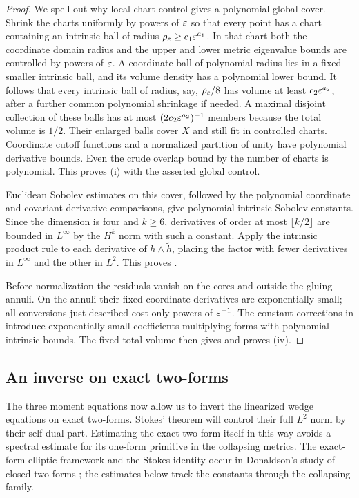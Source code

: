 \begin{proof}
We spell out why local chart control gives a polynomial global
cover.  Shrink the charts uniformly by powers of $\varepsilon$ so that
every point has a chart containing an intrinsic ball of radius
$\rho_\varepsilon\ge c_1\varepsilon^{a_1}$.  In that chart both the coordinate
domain radius and the upper and lower metric eigenvalue bounds are
controlled by powers of $\varepsilon$.  A coordinate ball of polynomial
radius lies in a fixed smaller intrinsic ball, and its volume density
has a polynomial lower bound.  It follows that every intrinsic ball
of radius, say, $\rho_\varepsilon/8$ has volume at least
$c_2\varepsilon^{a_2}$, after a further common polynomial shrinkage if needed.
A maximal disjoint collection of these balls has at most
$(2c_2\varepsilon^{a_2})^{-1}$ members because the total volume is $1/2$.
Their enlarged balls cover $X$ and still fit in controlled charts.
Coordinate cutoff functions and a normalized partition of unity have
polynomial derivative bounds.  Even the crude overlap bound by the
number of charts is polynomial.  This proves (i) with the asserted
global control.

Euclidean Sobolev estimates on this cover, followed by the polynomial
coordinate and covariant-derivative comparisons, give polynomial
intrinsic Sobolev constants.  Since the dimension is four and
$k\ge6$, derivatives of order at most $\lfloor k/2\rfloor$ are bounded
in $L^\infty$ by the $H^k$ norm with such a constant.  Apply the
intrinsic product rule to each derivative of $h\wedge\widetilde h$,
placing the factor with fewer derivatives in $L^\infty$ and the
other in $L^2$.  This proves .

Before normalization the residuals vanish on the cores and outside
the gluing annuli.  On the annuli their fixed-coordinate derivatives
are exponentially small; all conversions just described cost only
powers of $\varepsilon^{-1}$.  The constant corrections in
 introduce exponentially small
coefficients multiplying forms with polynomial intrinsic bounds.
The fixed total volume then gives
 and proves (iv).
\end{proof}

\subsection{An inverse on exact two-forms}

The three moment equations now allow us to invert the linearized wedge
equations on exact two-forms.  Stokes' theorem will control their full
$L^2$ norm by their self-dual part.  Estimating the exact two-form itself
in this way avoids a spectral estimate for its one-form primitive in
the collapsing metrics.  The exact-form elliptic framework and the
Stokes identity occur in Donaldson's study of closed two-forms
\cite[Section~2, Proposition~1, and Section~4, Lemma~1]{Donaldson2006};
the estimates below track the constants through the collapsing family.

